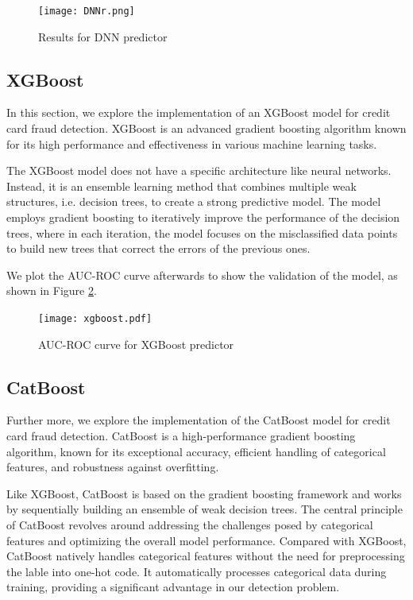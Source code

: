 \begin{figure}[htbp]
	\centering
	\texttt{[image: DNNr.png]}
	\caption{Results for DNN predictor}
	\label{fig:DNNr}
\end{figure}



\subsection{XGBoost}

In this section, we explore the implementation of an XGBoost model for credit card fraud detection. XGBoost is an advanced gradient boosting algorithm known for its high performance and effectiveness in various machine learning tasks.

The XGBoost model does not have a specific architecture like neural networks. Instead, it is an ensemble learning method that combines multiple weak structures, i.e. decision trees, to create a strong predictive model. The model employs gradient boosting to iteratively improve the performance of the decision trees, where in each iteration, the model focuses on the misclassified data points to build new trees that correct the errors of the previous ones.

We plot the AUC-ROC curve afterwards to show the validation of the model, as shown in Figure \ref{fig:XGBoost}.

\begin{figure}[htbp]
	\centering
	\texttt{[image: xgboost.pdf]}
	\caption{AUC-ROC curve for XGBoost predictor}
	\label{fig:XGBoost}
\end{figure}

\subsection{CatBoost}

Further more, we explore the implementation of the CatBoost model for credit card fraud detection. CatBoost is a high-performance gradient boosting algorithm, known for its exceptional accuracy, efficient handling of categorical features, and robustness against overfitting.

Like XGBoost, CatBoost is based on the gradient boosting framework and works by sequentially building an ensemble of weak decision trees. The central principle of CatBoost revolves around addressing the challenges posed by categorical features and optimizing the overall model performance. Compared with XGBoost, CatBoost natively handles categorical features without the need for preprocessing the lable into one-hot code. It automatically processes categorical data during training, providing a significant advantage in our detection problem. 

